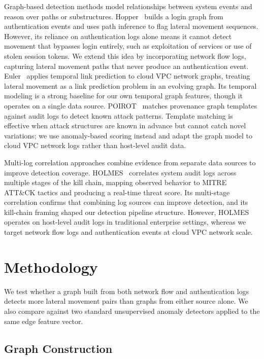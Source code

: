 \documentclass[letterpaper,twocolumn,10pt]{article}
\begin{document}
Graph-based detection methods model relationships between system events and reason over paths or substructures. Hopper~\cite{hopper2021} builds a login graph from authentication events and uses path inference to flag lateral movement sequences. However, its reliance on authentication logs alone means it cannot detect movement that bypasses login entirely, such as exploitation of services or use of stolen session tokens. We extend this idea by incorporating network flow logs, capturing lateral movement paths that never produce an authentication event. Euler~\cite{euler2023} applies temporal link prediction to cloud VPC network graphs, treating lateral movement as a link prediction problem in an evolving graph. Its temporal modeling is a strong baseline for our own temporal graph features, though it operates on a single data source. POIROT~\cite{poirot2019} matches provenance graph templates against audit logs to detect known attack patterns. Template matching is effective when attack structures are known in advance but cannot catch novel variations; we use anomaly-based scoring instead and adapt the graph model to cloud VPC network logs rather than host-level audit data.

Multi-log correlation approaches combine evidence from separate data sources to improve detection coverage. HOLMES~\cite{holmes2019} correlates system audit logs across multiple stages of the kill chain, mapping observed behavior to MITRE ATT\&CK tactics and producing a real-time threat score. Its multi-stage correlation confirms that combining log sources can improve detection, and its kill-chain framing shaped our detection pipeline structure. However, HOLMES operates on host-level audit logs in traditional enterprise settings, whereas we target network flow logs and authentication events at cloud VPC network scale.

\section{Methodology}

We test whether a graph built from both network flow and authentication logs detects more lateral movement pairs than graphs from either source alone. We also compare against two standard unsupervised anomaly detectors applied to the same edge feature vector.

\subsection{Graph Construction}
\end{document}
